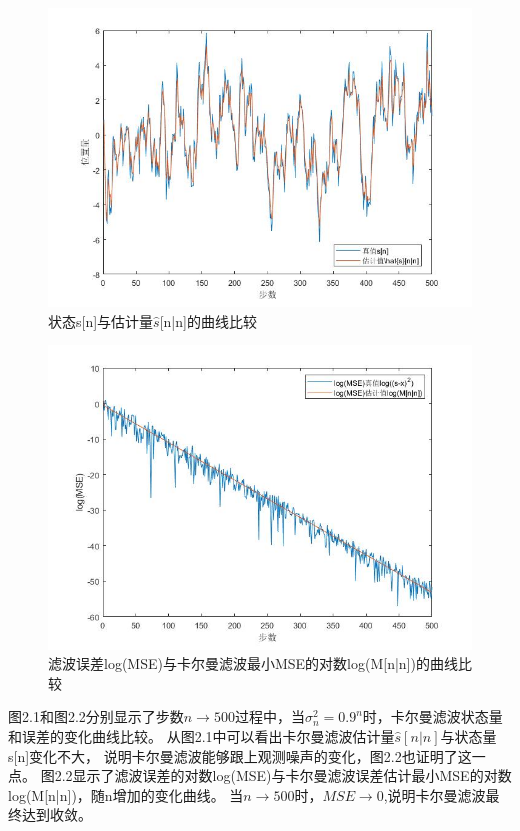 \documentclass[fontset=windows]{article}
\numberwithin{figure}{section}
\begin{document}
\begin{figure}[H]
    \centering
    \includegraphics[scale=0.5]{2_1.jpg}
    \caption{状态s[n]与估计量\(\hat{s}\)[n|n]的曲线比较}
    \label{2.1}
\end{figure}

\begin{figure}[H]
    \centering
    \includegraphics[scale=0.5]{2_2.jpg}
    \caption{滤波误差log(MSE)与卡尔曼滤波最小MSE的对数log(M[n|n])的曲线比较}
    \label{2.2}
\end{figure}

图2.1和图2.2分别显示了步数\(n\to 500\)过程中，当\(\sigma_n^2=0.9^n\)时，卡尔曼滤波状态量和误差的变化曲线比较。
从图2.1中可以看出卡尔曼滤波估计量\(\hat{s}[n|n]\)与状态量s[n]变化不大，
说明卡尔曼滤波能够跟上观测噪声的变化，图2.2也证明了这一点。
图2.2显示了滤波误差的对数log(MSE)与卡尔曼滤波误差估计最小MSE的对数log(M[n|n])，随n增加的变化曲线。
当\(n\to 500\)时，\(MSE\to 0\),说明卡尔曼滤波最终达到收敛。
\end{document}
